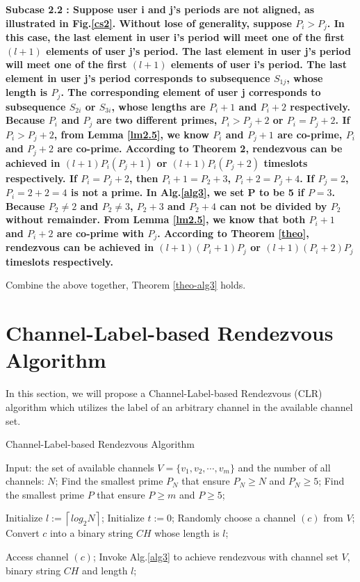 \documentclass[10pt, conference, letterpaper]{IEEEtran}
\begin{document}
\begin{IEEEproof}
\bfseries Subcase 2.2 \mdseries: Suppose user i and j's periods are not aligned, as illustrated in Fig.\ref{cs2}. Without lose of generality, suppose $P_i > P_j$. In this case, the last element in user i's period will meet one of the first $(l + 1)$ elements of user j's period. The last element in user j's period will meet one of the first $(l + 1)$ elements of user i's period. The last element in user j's period corresponds to subsequence $S_{1j}$, whose length is $P_j$. The corresponding element of user j corresponds to subsequence $S_{2i}$ or $S_{3i}$, whose lengths are $P_i +1$ and $P_i +2$ respectively. Because $P_i$ and $P_j$ are two different primes, $P_i > P_j +2$ or $P_i = P_j +2$. If $P_i > P_j + 2$, from Lemma \ref{lm2.5}, we know $P_i$ and $P_j + 1$ are co-prime, $P_i$ and $P_j +2 $ are co-prime. According to Theorem 2, rendezvous can be achieved in $(l + 1)P_i(P_j+1)$ or $(l + 1)P_i(P_j+2)$ timeslots respectively. If $P_i = P_j + 2$, then $P_i + 1 = P_2 + 3$, $P_i + 2 = P_j + 4$. If $P_j = 2$, $P_i = 2 + 2=4$ is not a prime. In Alg.\ref{alg3}, we set P to be 5 if $P=3$. Because $P_2 \ne 2$ and $P_2 \ne 3$, $P_2 + 3$ and $P_2 + 4$ can not be divided by $P_2$ without remainder. From Lemma \ref{lm2.5}, we know that both $P_i + 1$ and $P_i +2$ are co-prime with $P_j$. According to Theorem \ref{theo}, rendezvous can be achieved in $(l + 1)(P_i + 1)P_j$ or $(l + 1)(P_i+2)P_j$ timeslots respectively.

Combine the above together, Theorem \ref{theo-alg3} holds.

\end{IEEEproof}


\section{Channel-Label-based Rendezvous Algorithm}
In this section, we will propose a Channel-Label-based Rendezvous (CLR) algorithm which utilizes the label of an arbitrary channel in the available channel set.
\begin{algorithm}
\caption{Channel-Label-based Rendezvous Algorithm}
\label{alg4}
\begin{algorithmic}[1]
\STATE Input: the set of available channels $V=\{v_1,v_2,\cdots,v_m\}$ and the number of all channels: $N$;
\STATE Find the smallest prime $P_N$ that ensure $ P_N \ge N$ and $P_N \ge 5$;
\STATE Find the smallest prime $P$ that ensure $P \ge m$ and $P \ge 5$;

\STATE Initialize $l:=\left \lceil log_2 N \right \rceil$;
\STATE Initialize $t := 0$;
\STATE Randomly choose a channel $(c)$ from $V$;
\STATE Convert $c$ into a binary string $CH$ whose length is $l$;

\STATE Access channel $(c)$;
\ENDWHILE
\STATE Invoke Alg.\ref{alg3} to achieve rendezvous with channel set $V$, binary string $CH$ and length $l$;
\end{algorithmic}
\end{algorithm}
\end{document}
